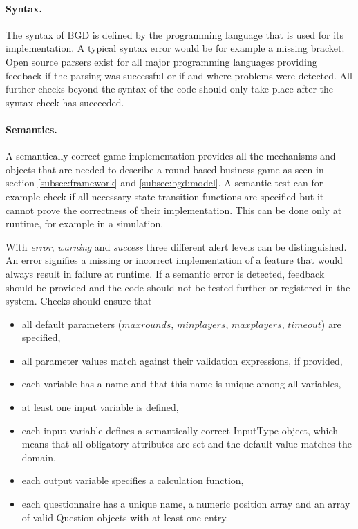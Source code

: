 \paragraph{Syntax.} The syntax of BGD is defined by the programming language that is used for its implementation. A typical syntax error would be for example a missing bracket. Open source parsers exist for all major programming languages providing feedback if the parsing was successful or if and where problems were detected. All further checks beyond the syntax of the code should only take place after the syntax check has succeeded.

\paragraph{Semantics.} A semantically correct game implementation provides all the mechanisms and objects that are needed to describe a round-based business game as seen in section \ref{subsec:framework} and \ref{subsec:bgd:model}. A semantic test can for example check if all necessary state transition functions are specified but it cannot prove the correctness of their implementation. This can be done only at runtime, for example in a simulation.

With \textit{error}, \textit{warning} and \textit{success} three different alert levels can be distinguished. An error signifies a missing or incorrect implementation of a feature that would always result in failure at runtime. If a semantic error is detected, feedback should be provided and the code should not be tested further or registered in the system. Checks should ensure that

\begin{itemize}
\item all default parameters ($maxrounds$, $minplayers$, $maxplayers$, $timeout$) are specified,
\item all parameter values match against their validation expressions, if provided,
\item each variable has a name and that this name is unique among all variables,
\item at least one input variable is defined,
\item each input variable defines a semantically correct InputType object, which means that all obligatory attributes are set and the default value matches the domain,
\item each output variable specifies a calculation function, 
\item each questionnaire has a unique name, a numeric position array and an array of valid Question objects with at least one entry.
\end{itemize}

